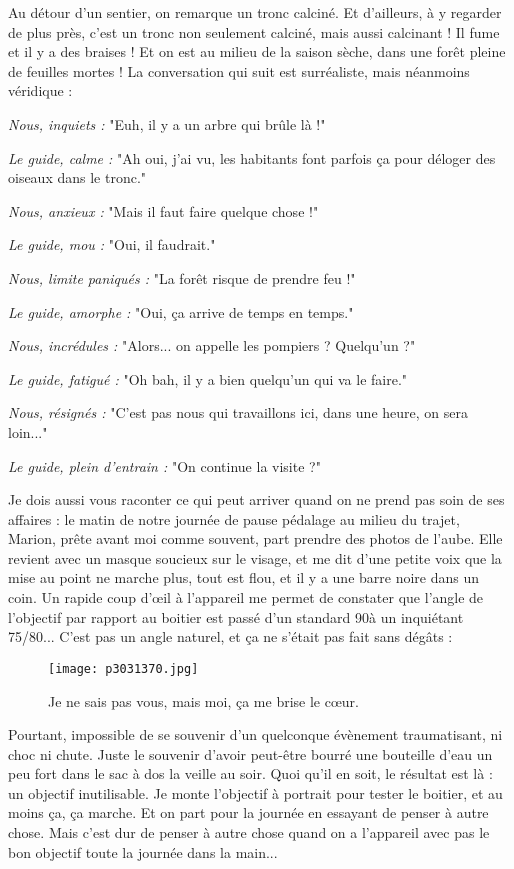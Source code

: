 \documentclass{book}
\begin{document}
Au détour d'un sentier, on remarque un tronc calciné. Et d'ailleurs, à y regarder de plus près, c'est un tronc non seulement calciné, mais aussi calcinant ! Il fume et il y a des braises ! Et on est au milieu de la saison sèche, dans une forêt pleine de feuilles mortes ! La conversation qui suit est surréaliste, mais néanmoins véridique :

\emph{Nous, inquiets :} "Euh, il y a un arbre qui brûle là !"

\emph{Le guide, calme :} "Ah oui, j'ai vu, les habitants font parfois ça pour déloger des oiseaux dans le tronc."

\emph{Nous, anxieux :} "Mais il faut faire quelque chose !"

\emph{Le guide, mou :} "Oui, il faudrait."

\emph{Nous, limite paniqués :} "La forêt risque de prendre feu !"

\emph{Le guide, amorphe :} "Oui, ça arrive de temps en temps."

\emph{Nous, incrédules :} "Alors... on appelle les pompiers ? Quelqu'un ?"

\emph{Le guide, fatigué :} "Oh bah, il y a bien quelqu'un qui va le faire."

\emph{Nous, résignés :} "C'est pas nous qui travaillons ici, dans une heure, on sera loin..."

\emph{Le guide, plein d'entrain :} "On continue la visite ?"


Je dois aussi vous raconter ce qui peut arriver quand on ne prend pas soin de ses affaires : le matin de notre journée de pause pédalage au milieu du trajet, Marion, prête avant moi comme souvent, part prendre des photos de l'aube. Elle revient avec un masque soucieux sur le visage, et me dit d'une petite voix que la mise au point ne marche plus, tout est flou, et il y a une barre noire dans un coin. Un rapide coup d’œil à l'appareil me permet de constater que l'angle de l'objectif par rapport au boitier est passé d'un standard 90\textdegree  à un inquiétant 75\textdegree /80\textdegree ... C'est pas un angle naturel, et ça ne s'était pas fait sans dégâts :


\begin{figure}[h]
\centering
\texttt{[image: p3031370.jpg]}
\caption*{Je ne sais pas vous, mais moi, ça me brise le cœur.}
\end{figure}

Pourtant, impossible de se souvenir d'un quelconque évènement traumatisant, ni choc ni chute. Juste le souvenir d'avoir peut-être bourré une bouteille d'eau un peu fort dans le sac à dos la veille au soir. Quoi qu'il en soit, le résultat est là : un objectif inutilisable. Je monte l'objectif à portrait pour tester le boitier, et au moins ça, ça marche. Et on part pour la journée en essayant de penser à autre chose. Mais c'est dur de penser à autre chose quand on a l'appareil avec pas le bon objectif toute la journée dans la main...
\end{document}
